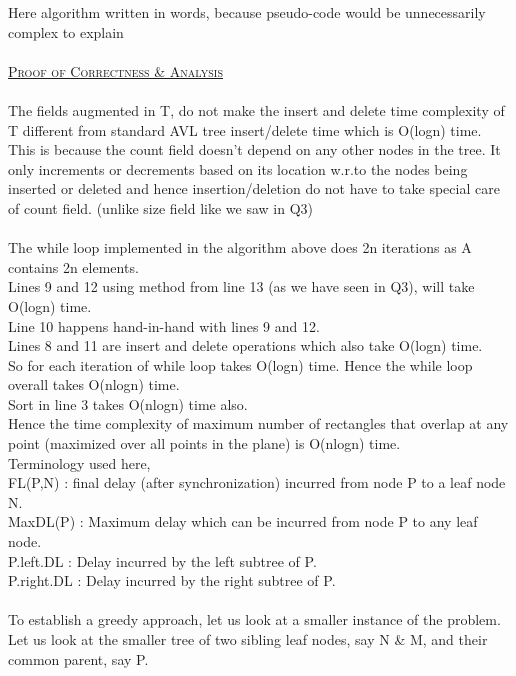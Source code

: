 \documentclass[a4 paper]{article}
\begin{document}
\vspace{4mm}
Here algorithm written in words, because pseudo-code would be unnecessarily complex to explain\\\\
\underline{\textsc{Proof of Correctness \& Analysis}}\\\\
The fields augmented in T, do not make the insert and delete time complexity of T different from standard AVL tree insert/delete time which is O(logn) time. This is because the count field doesn't depend on any other nodes in the tree. It only increments or decrements based on its location w.r.to the nodes being inserted or deleted and hence insertion/deletion do not have to take special care of count field. (unlike size field like we saw in Q3)\\
\\
The while loop implemented in the algorithm above does 2n iterations as A contains 2n elements.\\
Lines 9 and 12 using method from line 13 (as we have seen in Q3), will take O(logn) time.\\ 
Line 10 happens hand-in-hand with lines 9 and 12.\\
Lines 8 and 11 are insert and delete operations which also take O(logn) time.\\
So for each iteration of while loop takes O(logn) time. Hence the while loop overall takes O(nlogn) time.\\
Sort in line 3 takes O(nlogn) time also.\\
Hence the time complexity of maximum number of rectangles that overlap at any point (maximized over all points in the plane) is O(nlogn) time.\\
\newpage
{}
Terminology used here,\\
FL(P,N) : final delay (after synchronization) incurred from node P to a leaf node N.\\
MaxDL(P) : Maximum delay which can be incurred from node P to any leaf node.\\
P.left.DL : Delay incurred by the left subtree of P.\\
P.right.DL : Delay incurred by the right subtree of P.\\\\
To establish a greedy approach, let us look at a smaller instance of the problem. Let us look at the smaller tree of two sibling leaf nodes, say N \& M, and their common parent, say P.
\end{document}
